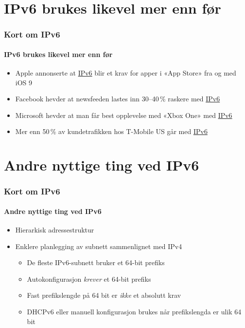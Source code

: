 \section{IPv6 brukes likevel mer enn før}
\begin{frame}%
  \frametitle{Kort om IPv6}
  \framesubtitle{IPv6 brukes likevel mer enn før}
  \pause
  \begin{itemize}[<+->]
  \item Apple annonserte at
    \href{https://developer.apple.com/videos/wwdc/2015/?id=102}{IPv6}
    blir et krav for apper i «App Store» fra og med iOS 9
  \item Facebook hevder at newsfeeden lastes inn 30--40\,\% raskere
    med
    \href{https://www.youtube.com/watch?v=An7s25FSK0U&feature=youtu.be&t=18m54s}{IPv6}
  \item Microsoft hevder at man får best opplevelse med «Xbox One» med
    \href{http://www.internetsociety.org/deploy360/blog/2013/10/microsoft-the-best-xbox-one-gaming-experience-will-be-over-ipv6/}{IPv6}
  \item Mer enn 50\,\% av kundetrafikken hos T-Mobile US går med
    \href{https://conference.apnic.net/data/37/464xlat-apricot-2014_1393236641.pdf}{IPv6}
  \end{itemize}
\end{frame}

\section{Andre nyttige ting ved IPv6}
\begin{frame}%
  \frametitle{Kort om IPv6}
  \framesubtitle{Andre nyttige ting ved IPv6}
  \pause
  \begin{itemize}[<+->]
  \item Hierarkisk adressestruktur
  \item Enklere planlegging av subnett sammenlignet med IPv4
    \begin{itemize}[<+->]
    \item De fleste IPv6-subnett bruker et 64-bit prefiks
    \item Autokonfigurasjon \textit{krever\/} et 64-bit prefiks
    \item Fast prefikslengde på 64 bit er \textit{ikke\/} et absolutt
      krav
    \item DHCPv6 eller manuell konfigurasjon brukes når prefikslengda
      er ulik 64 bit
    \end{itemize}
  \end{itemize}
\end{frame}


